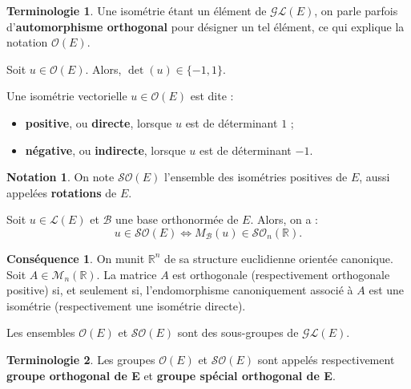 \documentclass[french]{article}
\newcommand{\R}{\mathbb{R}}
\theoremstyle{plain}
\theoremstyle{definition}
\newtheorem*{notation}{Notation}
\newtheorem*{terminologie}{Terminologie}
\newtheorem*{conséquence}{Conséquence}
\theoremstyle{remark}
\begin{document}
\begin{terminologie}
	Une isométrie étant un élément de $\mathcal{GL}(E)$, on parle parfois d'\textbf{automorphisme orthogonal} pour désigner un tel élément, ce qui explique la notation $\mathcal{O}(E)$.
\end{terminologie}

\begin{prop}
	Soit $u\in\mathcal{O}(E)$. Alors, $\det(u)\in\{-1,1\}$.
\end{prop}

\begin{dfn}
	Une isométrie vectorielle $u\in\mathcal{O}(E)$ est dite :
	\begin{itemize}
		\item \textbf{positive}, ou \textbf{directe}, lorsque $u$ est de déterminant $1$ ;
		\item \textbf{négative}, ou \textbf{indirecte}, lorsque $u$ est de déterminant $-1$.
	\end{itemize}
\end{dfn}

\begin{notation}
	On note $\mathcal{SO}(E)$ l'ensemble des isométries positives de $E$, aussi appelées \textbf{rotations} de $E$.
\end{notation}

\begin{prop}
	Soit $u\in\mathcal{L}(E)$ et $\mathcal{B}$ une base orthonormée de $E$. Alors, on a : $$u\in\mathcal{SO}(E)\iff M_\mathcal{B}(u)\in\mathcal{SO}_n(\R).$$
\end{prop}

\begin{conséquence}
	On munit $\R^n$ de sa structure euclidienne orientée canonique. Soit $A\in\mathcal{M}_n(\R)$. La matrice $A$ est orthogonale (respectivement orthogonale positive) si, et seulement si, l'endomorphisme canoniquement associé à $A$ est une isométrie (respectivement une isométrie directe).
\end{conséquence}

\begin{cor}{}
	Les ensembles $\mathcal{O}(E)$ et $\mathcal{SO}(E)$ sont des sous-groupes de $\mathcal{GL}(E)$.
\end{cor}

\begin{terminologie}
	Les groupes $\mathcal{O}(E)$ et $\mathcal{SO}(E)$ sont appelés respectivement \textbf{groupe orthogonal de E} et \textbf{groupe spécial orthogonal de E}.
\end{terminologie}
\end{document}
